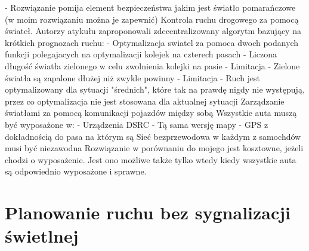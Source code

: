   \newline
  - Rozwiązanie pomija element bezpieczeństwa jakim jest światło pomarańczowe (w moim rozwiązaniu można je zapewnić)
\newline
\newline
Kontrola ruchu drogowego za pomocą świateł. Autorzy atykułu \cite{lammer2008self} zaproponowali zdecentralizowany algorytm bazujący na krótkich prognozach ruchu:
  \newline
  - Optymalizacja swiatel za pomoca dwoch podanych funkcji polegajacych na optymalizacji kolejek na czterech pasach
  \newline
	- Liczona długość światła zielonego w celu zwolnienia kolejki na pasie
  \newline
  - Limitacja - Zielone światła są zapalone dłużej niż zwykle powinny
  \newline
	- Limitacja - Ruch jest optymalizowany dla sytuacji "średnich", które tak na prawdę nigdy nie występują, przez co optymalizacja nie jest stosowana dla aktualnej sytuacji
  \newline
  \newline
Zarządzanie światłami za pomocą komunikacji pojazdów między sobą \cite{ferreira2010self}
\newline
Wszystkie auta muszą być wyposażone w:
\newline
	- Urządzenia DSRC
\newline
  - Tą sama wersję mapy
\newline
	- GPS z dokładnością do pasa na którym są
\newline
Sieć bezprzewodowa w każdym z samochdów musi być niezawodna
\newline
Rozwiązanie w porównaniu do mojego jest kosztowne, jeżeli chodzi o wyposażenie. Jest ono możliwe także tylko wtedy kiedy wszystkie auta są odpowiednio wyposażone i sprawne.
    
\section{Planowanie ruchu bez sygnalizacji świetlnej}

